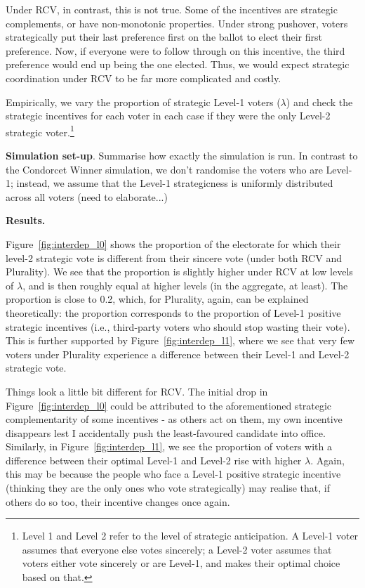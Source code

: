 \documentclass[11pt, letter]{article}
\begin{document}
Under RCV, in contrast, this is not true. Some of the incentives are strategic complements, or have non-monotonic properties. Under strong pushover, voters strategically put their last preference first on the ballot to elect their first preference. Now, if everyone were to follow through on this incentive, the third preference would end up being the one elected. Thus, we would expect strategic coordination under RCV to be far more complicated and costly.

Empirically, we vary the proportion of strategic Level-1 voters ($\lambda$) and check the strategic incentives for each voter in each case if they were the only Level-2 strategic voter.\footnote{Level 1 and Level 2 refer to the level of strategic anticipation. A Level-1 voter assumes that everyone else votes sincerely; a Level-2 voter assumes that voters either vote sincerely or are Level-1, and makes their optimal choice based on that.}

\textbf{Simulation set-up}. Summarise how exactly the simulation is run. In contrast to the Condorcet Winner simulation, we don't randomise the voters who are Level-1; instead, we assume that the Level-1 strategicness is uniformly distributed across all voters (need to elaborate...)

\textbf{Results.} 

Figure~\ref{fig:interdep_l0} shows the proportion of the electorate for which their level-2 strategic vote is different from their sincere vote (under both RCV and Plurality). We see that the proportion is slightly higher under RCV at low levels of $\lambda$, and is then roughly equal at higher levels (in the aggregate, at least). The proportion is close to 0.2, which, for Plurality, again, can be explained theoretically: the proportion corresponds to the proportion of Level-1 positive strategic incentives (i.e., third-party voters who should stop wasting their vote). This is further supported by Figure~\ref{fig:interdep_l1}, where we see that very few voters under Plurality experience a difference between their Level-1 and Level-2 strategic vote.

Things look a little bit different for RCV. The initial drop in Figure~\ref{fig:interdep_l0} could be attributed to the aforementioned strategic complementarity of some incentives - as others act on them, my own incentive disappears lest I accidentally push the least-favoured candidate into office. Similarly, in Figure~\ref{fig:interdep_l1}, we see the proportion of voters with a difference between their optimal Level-1 and Level-2 rise with higher $\lambda$. Again, this may be because the people who face a Level-1 positive strategic incentive (thinking they are the only ones who vote strategically) may realise that, if others do so too, their incentive changes once again.
\end{document}
